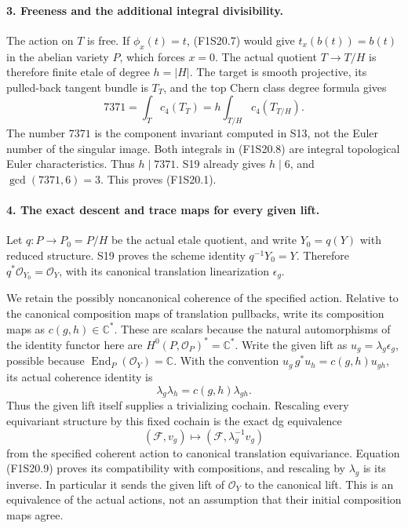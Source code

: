 \paragraph{3. Freeness and the additional integral divisibility.}
The action on $T$ is free. If $\phi_x(t)=t$, (F1S20.7)
would give $t_x(b(t))=b(t)$ in the abelian variety $P$,
which forces $x=0$. The actual quotient $T\to T/H$ is
therefore finite etale of degree $h=|H|$. The target is
smooth projective, its pulled-back tangent bundle is $T_T$,
and the top Chern class degree formula gives
\[
             7371=\int_T c_4(T_T)
                       =h\int_{T/H}c_4(T_{T/H}).
 \tag{F1S20.8}
\]
The number $7371$ is the component invariant computed in
S13, not the Euler number of the singular image. Both
integrals in (F1S20.8) are integral topological Euler
characteristics. Thus $h\mid7371$. S19 already gives
$h\mid6$, and $\gcd(7371,6)=3$. This proves (F1S20.1).

\paragraph{4. The exact descent and trace maps for every given lift.}
Let $q:P\to P_0=P/H$ be the actual etale quotient, and
write $Y_0=q(Y)$ with reduced structure. S19 proves the
scheme identity $q^{-1}Y_0=Y$. Therefore
$q^*\mathcal O_{Y_0}=\mathcal O_Y$, with its canonical
translation linearization $\epsilon_g$.

We retain the possibly noncanonical coherence of the
specified action. Relative to the canonical composition
maps of translation pullbacks, write its composition
maps as $c(g,h)\in\mathbb C^*$. These are scalars because
the natural automorphisms of the identity functor here
are $H^0(P,\mathcal O_P)^*=\mathbb C^*$. Write the given
lift as $u_g=\lambda_g\epsilon_g$, possible because
$\operatorname{End}_P(\mathcal O_Y)=\mathbb C$.
With the convention $u_g\,g^*u_h=c(g,h)u_{gh}$, its
actual coherence identity is
\[
                 \lambda_g\lambda_h=c(g,h)\lambda_{gh}.
 \tag{F1S20.9}
\]
Thus the given lift itself supplies a trivializing
cochain. Rescaling every equivariant structure by this
fixed cochain is the exact dg equivalence
\[
 (\mathcal F,v_g)\longmapsto
                  (\mathcal F,\lambda_g^{-1}v_g)
 \tag{F1S20.9a}
\]
from the specified coherent action to canonical
translation equivariance. Equation (F1S20.9) proves its
compatibility with compositions, and rescaling by
$\lambda_g$ is its inverse. In particular it sends the
given lift of $\mathcal O_Y$ to the canonical lift.
This is an equivalence of the actual actions, not an
assumption that their initial composition maps agree.


